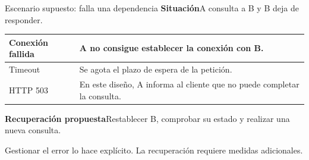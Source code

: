 \begin{frame}{Escenario supuesto: falla una dependencia}\relax
\small
\textbf{Situación}\quad A consulta a B y B deja de responder.
\medskip
\begin{tabularx}{\linewidth}{|l|X|}
\hline
Conexión fallida & A no consigue establecer la conexión con B.\\\hline
Timeout & Se agota el plazo de espera de la petición.\\\hline
HTTP 503 & En este diseño, A informa al cliente que no puede completar la consulta.\\\hline
\end{tabularx}
\medskip
\textbf{Recuperación propuesta}\quad Restablecer B, comprobar su estado y realizar una nueva consulta.
\par\medskip
{\footnotesize Gestionar el error lo hace explícito. La recuperación requiere medidas adicionales. \cite{java17httprequest,azureRetry2026}}
\end{frame}
